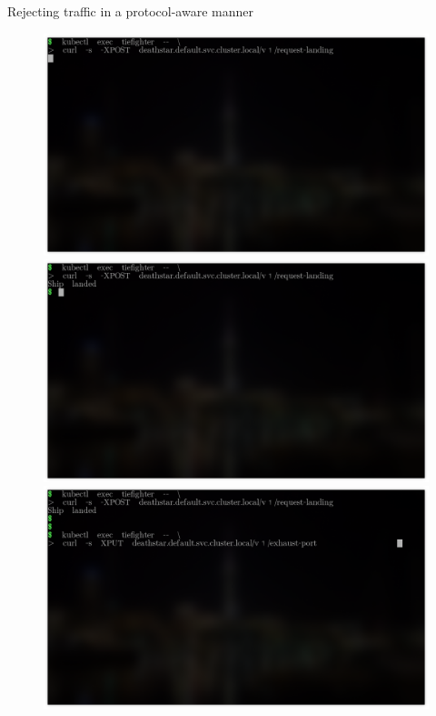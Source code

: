 \documentclass[black,white]{beamer}
\DeclareRobustCommand{\#}{\adjustbox{valign=B,totalheight=.57\baselineskip}{\oldhash}}%
\begin{document}
    \begin{frame}{Rejecting traffic in a protocol-aware manner}
        \vfill
        \begin{figure}
        \begin{overprint}
            \includegraphics[width=\textwidth]{l7-deny-0.png}
            \includegraphics[width=\textwidth]{l7-deny-1.png}
            \includegraphics[width=\textwidth]{l7-deny-2.png}

\end{overprint}
\end{figure}
\end{frame}
\end{document}
